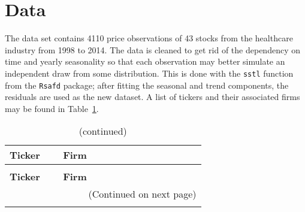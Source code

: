 \section{Data}
\label{sec:usage:data}

The data set contains 4110 price observations of 43 stocks from the healthcare 
industry from 1998 to 2014. The data is cleaned to get rid of the 
dependency on time and yearly seasonality so that each observation may better 
simulate an independent draw from some distribution. This is done 
with the \texttt{sstl} function from the \texttt{Rsafd} package; 
after fitting the seasonal and trend components, the residuals are used as the 
new dataset. A list of tickers and their associated firms may be found in 
Table~\ref{tab:usage:tickers}.

\newpage
\tablespacing
\begin{longtable}{p{0.15\linewidth} p{0.5\linewidth}}
	
	\caption[Healthcare firms and tickers.]{Healthcare firms and tickers.} 
	\label{tab:usage:tickers}\\
	\toprule
	\textbf{Ticker} & \textbf{Firm} \\
	\midrule
	\endfirsthead
	
	\caption[]{(continued)}\\
	\toprule
	\textbf{Ticker} & \textbf{Firm} \\
	\midrule
	\endhead
	
	\midrule
	\multicolumn{2}{r}{(Continued on next page)}\\
	\endfoot
	
	\bottomrule
	\endlastfoot
	

\end{longtable}
